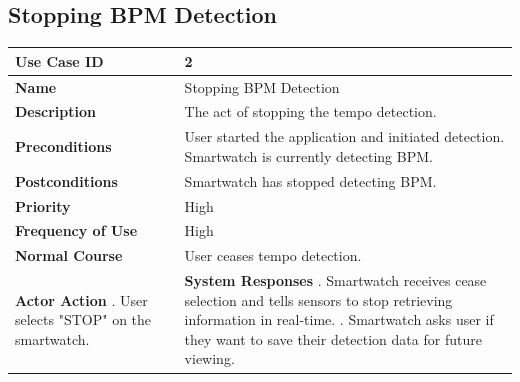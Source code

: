 \documentclass[12pt]{article}
\begin{document}
\subsection{Stopping BPM Detection}
\begin{center}
  \begin{tabular}{ |p{2.5in}|p{3in}| }
  \hline
  \textbf{Use Case ID} & 2 \\[.25in] 
  \hline
  \textbf{Name} & Stopping BPM Detection \\[.25in] 
  \hline 
  \textbf{Description} & The act of stopping the tempo detection. \\[.25in] 
  \hline 
  \textbf{Preconditions} & User started the application and initiated detection. Smartwatch is currently detecting BPM. \\
  \hline
  \textbf{Postconditions} & Smartwatch has stopped detecting BPM. \\[.25in] 
  \hline
  \textbf{Priority} & High \\[.25in] 
  \hline 
  \textbf{Frequency of Use} & High \\[.25in] 
  \hline 
  \textbf{Normal Course} & User ceases tempo detection. \\[.25in] 
  \hline 
  \textbf{Actor Action} \newline \newline 
  1. User selects "STOP" on the smartwatch.
  & \textbf{System Responses} \newline \newline
  2. Smartwatch receives cease selection and tells sensors to stop retrieving information in real-time. \newline
  3. Smartwatch asks user if they want to save their detection data for future viewing. \\[.25in] 
  \hline
  \end{tabular}
\end{center}
  
\end{document}
